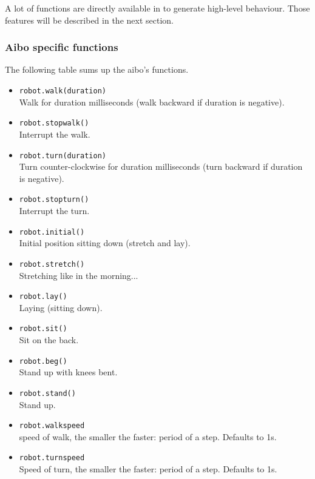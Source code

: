  A lot of functions are directly available in \urbi to generate
high-{}level behaviour. Those features will be described in the
next section.


\subsubsection{Aibo specific functions}
\label{webots.builtin.robots.aibo}%

 The following table sums up the aibo's functions.

\begin{itemize}
\item \lstinline|robot.walk(duration)|\\
  Walk for duration milliseconds (walk backward if duration is negative).
\item \lstinline|robot.stopwalk()|\\
  Interrupt the walk.
\item \lstinline|robot.turn(duration)|\\
  Turn counter-clockwise for duration milliseconds (turn backward if duration is negative).
\item \lstinline|robot.stopturn()|\\
  Interrupt the turn.
\item \lstinline|robot.initial()|\\
  Initial position sitting down (stretch and lay).
\item \lstinline|robot.stretch()|\\
  Stretching like in the morning...
\item \lstinline|robot.lay()|\\
  Laying (sitting down).
\item \lstinline|robot.sit()|\\
  Sit on the back.
\item \lstinline|robot.beg()|\\
  Stand up with knees bent.
\item \lstinline|robot.stand()|\\
  Stand up.
\end{itemize}

\begin{itemize}
\item \lstinline|robot.walkspeed|\\
  speed of walk, the smaller the faster: period of a step. Defaults to
  1s.
\item \lstinline|robot.turnspeed|\\
  Speed of turn, the smaller the faster: period of a step. Defaults to
  1s.
\end{itemize}

